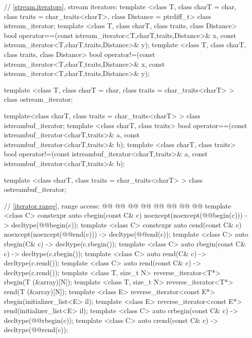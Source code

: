 \begin{codeblock}

  // \ref{stream.iterators}, stream iterators:
  template <class T, class charT = char, class traits = char_traits<charT>,
      class Distance = ptrdiff_t>
  class istream_iterator;
  template <class T, class charT, class traits, class Distance>
    bool operator==(const istream_iterator<T,charT,traits,Distance>& x,
            const istream_iterator<T,charT,traits,Distance>& y);
  template <class T, class charT, class traits, class Distance>
    bool operator!=(const istream_iterator<T,charT,traits,Distance>& x,
            const istream_iterator<T,charT,traits,Distance>& y);

  template <class T, class charT = char, class traits = char_traits<charT> >
      class ostream_iterator;

  template<class charT, class traits = char_traits<charT> >
    class istreambuf_iterator;
  template <class charT, class traits>
    bool operator==(const istreambuf_iterator<charT,traits>& a,
            const istreambuf_iterator<charT,traits>& b);
  template <class charT, class traits>
    bool operator!=(const istreambuf_iterator<charT,traits>& a,
            const istreambuf_iterator<charT,traits>& b);

  template <class charT, class traits = char_traits<charT> >
    class ostreambuf_iterator;

  // \ref{iterator.range}, range access:
  @@
  @@
  @@
  @@
  @@
  @@
  @@
  @@
  template <class C> constexpr auto cbegin(const C& c) noexcept(noexcept(@@begin(c)))
    -> decltype(@@begin(c));
  template <class C> constexpr auto cend(const C& c) noexcept(noexcept(@@end(c)))
    -> decltype(@@end(c));
  template <class C> auto rbegin(C& c) -> decltype(c.rbegin());
  template <class C> auto rbegin(const C& c) -> decltype(c.rbegin());
  template <class C> auto rend(C& c) -> decltype(c.rend());
  template <class C> auto rend(const C& c) -> decltype(c.rend());
  template <class T, size_t N> reverse_iterator<T*> rbegin(T (&array)[N]);
  template <class T, size_t N> reverse_iterator<T*> rend(T (&array)[N]);
  template <class E> reverse_iterator<const E*> rbegin(initializer_list<E> il);
  template <class E> reverse_iterator<const E*> rend(initializer_list<E> il);
  template <class C> auto crbegin(const C& c) -> decltype(@@rbegin(c));
  template <class C> auto crend(const C& c) -> decltype(@@rend(c));
\end{codeblock}
